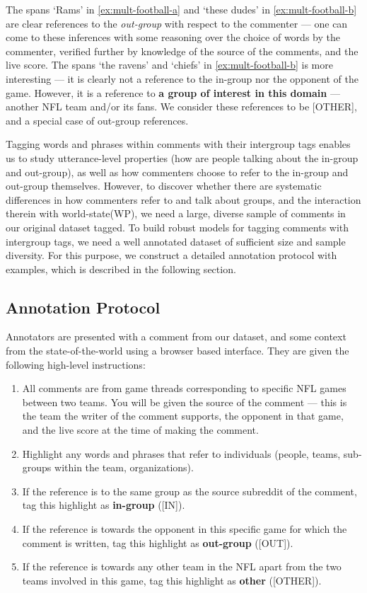 The spans `Rams' in \ref{ex:mult-football-a} and `these dudes' in \ref{ex:mult-football-b} are clear references to the \emph{out-group} with respect to the commenter --- one can come to these inferences with some reasoning over the choice of words by the commenter, verified further by knowledge of the source of the comments, and the live score. The spans `the ravens' and `chiefs' in \ref{ex:mult-football-b} is more interesting --- it is clearly not a reference to the in-group nor the opponent of the game. However, it is a reference to \textbf{a group of interest in this domain} --- another NFL team and/or its fans. We consider these references to be [OTHER], and a special case of out-group references.

Tagging words and phrases within comments with their intergroup tags enables us to study utterance-level properties (how are people talking about the in-group and out-group), as well as how commenters choose to refer to the in-group and out-group themselves. However, to discover whether there are systematic differences in how commenters refer to and talk about groups, and the interaction therein with world-state(WP), we need a large, diverse sample of comments in our original dataset tagged. To build robust models for tagging comments with intergroup tags, we need a well annotated dataset of sufficient size and sample diversity. For this purpose, we construct a detailed annotation protocol with examples, which is described in the following section.

\subsection{Annotation Protocol}

Annotators are presented with a comment from our dataset, and some context from the state-of-the-world using a browser based interface. They are given the following high-level instructions:

\begin{enumerate}
    \item All comments are from game threads corresponding to specific NFL games between two teams. You will be given the source of the comment --- this is the team the writer of the comment supports, the opponent in that game, and the live score at the time of making the comment.
    \item Highlight any words and phrases that refer to individuals (people, teams, sub-groups within the team, organizations).
    \item If the reference is to the same group as the source subreddit of the comment, tag this highlight as \textbf{in-group} ([IN]).
    \item If the reference is towards the opponent in this specific game for which the comment is written, tag this highlight as \textbf{out-group} ([OUT]).
    \item If the reference is towards any other team in the NFL apart from the two teams involved in this game, tag this highlight as \textbf{other} ([OTHER]).
\end{enumerate}

